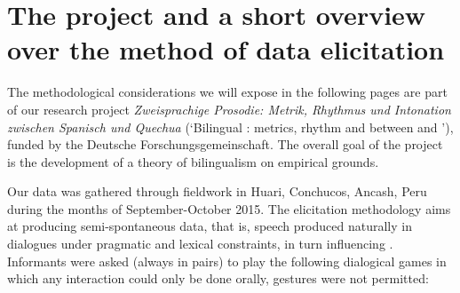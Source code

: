 \documentclass[output=paper]{LSP/langsci}
\begin{document}
\section{The project and a short overview over the method of data elicitation}

The methodological considerations we will expose in the following pages are part of our research project \textit{Zweisprachige Prosodie: Metrik, Rhythmus und Intonation zwischen Spanisch und Quechua} (`Bilingual : metrics, rhythm and  between  and '), funded by the Deutsche Forschungsgemeinschaft. The overall goal of the project is the development of a  theory of bilingualism on empirical grounds.

Our data was gathered through fieldwork in Huari, Conchucos, Ancash, Peru during the months of September-October 2015. The elicitation methodology aims at producing semi-spontaneous data, that is, speech produced naturally in dialogues under pragmatic and lexical constraints, in turn influencing . Informants were asked (always in pairs) to play the following dialogical games in which any interaction could only be done orally, gestures were not permitted:
\end{document}
